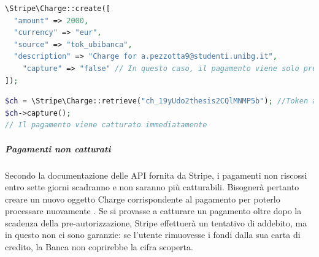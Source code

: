 \begin{lstlisting}[language=PHP, caption={creazione di un oggetto \textit{Charge}, che verrà poi utilizzato catturare il pagamento corrispondente, con cattura entro sette giorni}]
\Stripe\Charge::create([
  "amount" => 2000,
  "currency" => "eur",
  "source" => "tok_ubibanca", 
  "description" => "Charge for a.pezzotta9@studenti.unibg.it",
	"capture" => "false" // In questo caso, il pagamento viene solo pre-autorizzato
]);
\end{lstlisting}

\begin{lstlisting}[language=PHP, caption={cattura di un pagamento tramite le API Stripe}]
$ch = \Stripe\Charge::retrieve("ch_19yUdo2thesis2CQlMNMP5b"); //Token associato all'utente
$ch->capture();
// Il pagamento viene catturato immediatamente
\end{lstlisting}

\subparagraph{Pagamenti non catturati}
Secondo la documentazione delle API fornita da Stripe, i pagamenti non riscossi entro sette giorni scadranno e non saranno più catturabili. Bisognerà pertanto creare un nuovo oggetto Charge corrispondente al pagamento per poterlo processare nuovamente \cite{stripedoc}. Se si provasse a catturare un pagamento oltre dopo la scadenza della pre-autorizzazione, Stripe effettuerà un tentativo di addebito, ma in questo non ci sono garanzie: se l'utente rimuovesse i fondi dalla sua carta di credito, la Banca non coprirebbe la cifra scoperta. 
